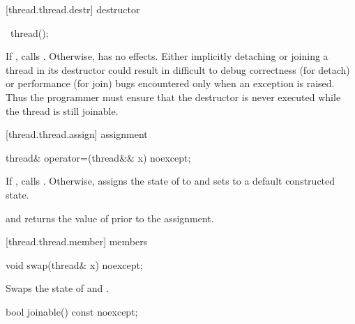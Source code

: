 [thread.thread.destr]{ destructor}

%
\begin{itemdecl}
~thread();
\end{itemdecl}

\begin{itemdescr}
\pnum
If , calls . Otherwise, has no effects.
\enternote Either implicitly detaching or joining a  thread in its
destructor could result in difficult to debug correctness (for detach) or performance
(for join) bugs encountered only when an exception is raised. Thus the programmer must
ensure that the destructor is never executed while the thread is still joinable.
\exitnote
\end{itemdescr}

[thread.thread.assign]{ assignment}

%
%
\begin{itemdecl}
thread& operator=(thread&& x) noexcept;
\end{itemdecl}

\begin{itemdescr}
\pnum
\effects If , calls . Otherwise, assigns the
state of  to  and sets  to a default constructed state.

\pnum
\postconditions {} and  returns the value of
 prior to the assignment.

\pnum
\returns {}
\end{itemdescr}

[thread.thread.member]{ members}

%
%
\begin{itemdecl}
void swap(thread& x) noexcept;
\end{itemdecl}

\begin{itemdescr}
\pnum
\effects Swaps the state of  and .
\end{itemdescr}

%
%
\begin{itemdecl}
bool joinable() const noexcept;
\end{itemdecl}

